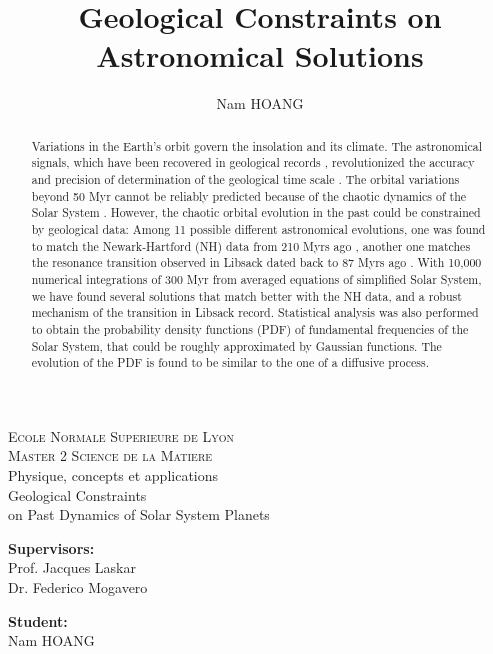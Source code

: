 \documentclass[12pt]{article}
\title{Geological Constraints on Astronomical Solutions}
\author{Nam HOANG}
\begin{document}
	\begin{titlepage}

		
		\begin{center}
			\textsc{ \LARGE{Ecole Normale Superieure de Lyon \\}}
			\textsc{ \LARGE{Master 2 Science de la Matiere\\ }}
			\textnormal{ \LARGE{Physique, concepts et applications\\}}
			\vspace{30mm}
			\fontsize{10mm}{7mm}\selectfont 
			\textup{Geological Constraints \\on Past Dynamics of Solar System Planets}\\
		\end{center}
		\vspace{75mm}
		
		
		\begin{minipage}[t]{0.47\textwidth}
			\textnormal{\large{\bf Supervisors:\\}}
			{\large Prof. Jacques Laskar\\ Dr. Federico Mogavero}
		\end{minipage}\hfill\begin{minipage}[t]{0.47\textwidth}\raggedleft
			\textnormal{\large{\bf Student:\\}}
			{\large Nam HOANG }
		\end{minipage}
		
		\vspace{25mm}
		
		
	\end{titlepage}
	
	\begin{abstract}
		Variations in the Earth's orbit govern the insolation and its climate. The astronomical signals, which have been recovered in geological records \citep{hays1976}, revolutionized the accuracy and precision of determination of the geological time scale \citep{gradstein2012}. The orbital variations beyond 50 Myr cannot be reliably predicted because of the chaotic dynamics of the Solar System \citep{laskar1989}. However, the chaotic orbital evolution in the past could be constrained by geological data: Among 11 possible different astronomical evolutions, one was found to match the Newark-Hartford (NH) data from 210 Myrs ago \citep{olsen2019}, another one matches the resonance transition observed in Libsack dated back to 87 Myrs ago \citep{ma2017}. With 10,000 numerical integrations of 300 Myr from averaged equations of simplified Solar System, we have found several solutions that match better with the NH data, and a robust mechanism of the transition in Libsack record. Statistical analysis was also performed to obtain the probability density functions (PDF) of fundamental frequencies of the Solar System, that could be roughly approximated by Gaussian functions. The evolution of the PDF is found to be similar to the one of a diffusive process.
		
	\end{abstract}
	\newpage
\end{document}
